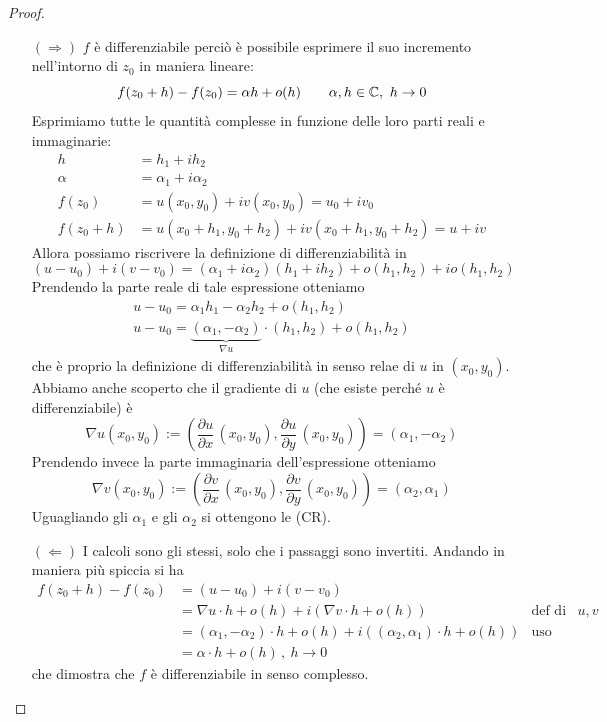 \begin{proof}\leavevmode
\begin{enumerate}
    \item [$(\Rightarrow)$] $f$ è differenziabile perciò è possibile esprimere il suo incremento nell'intorno di $z_0$ in maniera lineare:
    \begin{equation*}
    f(z_0+h)-f(z_0)=\alpha h+o(h)\qquad \alpha,h\in\mathbb{C},\ h\to 0
    \end{equation*}
    Esprimiamo tutte le quantità complesse in funzione delle loro parti reali e immaginarie:
    \begin{align*}
    h&=h_1+ih_2\\
    \alpha&=\alpha_1+i\alpha_2 \\
    f(z_0)&=u(x_0,y_0)+iv(x_0,y_0)=u_0+iv_0 \\
    f(z_0+h)&=u(x_0+h_1,y_0+h_2)+iv(x_0+h_1,y_0+h_2)=u+iv    
    \end{align*}
    Allora possiamo riscrivere la definizione di differenziabilità in
    \begin{equation*}
    (u-u_0)+i(v-v_0)=(\alpha_1+i\alpha_2)(h_1+ih_2)+o(h_1,h_2)+io(h_1,h_2)
    \end{equation*}
    Prendendo la parte reale di tale espressione otteniamo
    \begin{gather*}
    u-u_0=\alpha_1h_1-\alpha_2h_2+o(h_1,h_2) \\
    u-u_0=\underbrace{(\alpha_1,-\alpha_2)}_{\nabla u}\cdot (h_1,h_2)+o(h_1,h_2)
    \end{gather*}
    che è proprio la definizione di differenziabilità in senso relae di $u$ in $(x_0,y_0)$. Abbiamo anche scoperto che il gradiente di $u$ (che esiste perché $u$ è differenziabile) è
    \begin{equation*}
    \nabla u(x_0,y_0):=\left(\frac{\partial u}{\partial x}\,(x_0,y_0),\frac{\partial u}{\partial y}\,(x_0,y_0)\right)=(\alpha_1,-\alpha_2)
    \end{equation*}
    Prendendo invece la parte immaginaria dell'espressione otteniamo
    \begin{equation*}
    \nabla v(x_0,y_0):=\left(\frac{\partial v}{\partial x}\,(x_0,y_0),\frac{\partial v}{\partial y}\,(x_0,y_0)\right)=(\alpha_2,\alpha_1)
    \end{equation*}
    Uguagliando gli $\alpha_1$ e gli $\alpha_2$ si ottengono le (CR).

    \item [$(\Leftarrow)$] I calcoli sono gli stessi, solo che i passaggi sono invertiti. Andando in maniera più spiccia si ha
    \begin{align*}
    f(z_0+h)-f(z_0)&=(u-u_0)+i(v-v_0) &\\
    &=\nabla u\cdot h+o(h)+i\left(\nabla v\cdot h+o(h)\right) &\text{def di diff per }u,v \\
    &=(\alpha_1,-\alpha_2)\cdot h+o(h)+i\left((\alpha_2,\alpha_1)\cdot h+o(h)\right) &\text{uso (CR)} \\
    &=\alpha\cdot h+o(h)\,,\ h\to 0
    \end{align*}
    che dimostra che $f$ è differenziabile in senso complesso.
\end{enumerate}
\end{proof}


